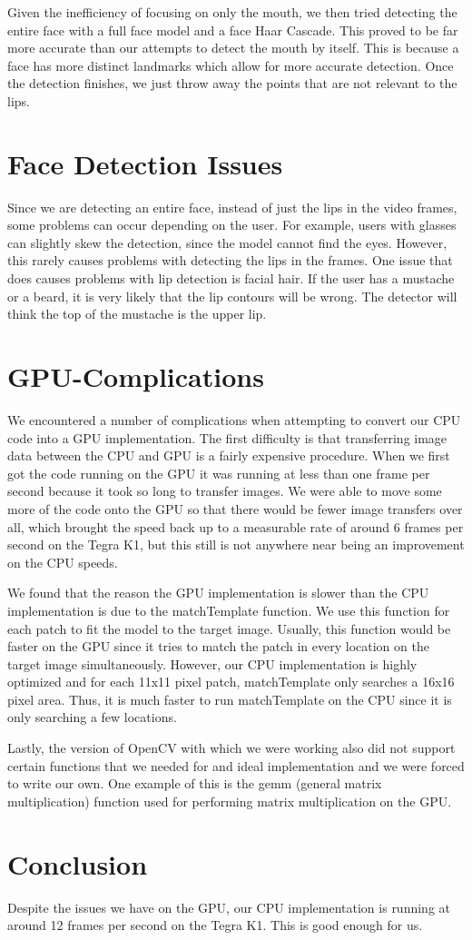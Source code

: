 Given the inefficiency of focusing on only the mouth, we then tried detecting the entire face with a full face model and a face Haar Cascade. This proved to be far more accurate than our attempts to detect the mouth by itself. This is because a face has more distinct landmarks which allow for more accurate detection. Once the detection finishes, we just throw away the points that are not relevant to the lips.

\section{Face Detection Issues}
Since we are detecting an entire face, instead of just the lips in the video frames, some problems can occur depending on the user. For example, users with glasses can slightly skew the detection, since the model cannot find the eyes. However, this rarely causes problems with detecting the lips in the frames. One issue that does causes problems with lip detection is facial hair. If the user has a mustache or a beard, it is very likely that the lip contours will be wrong. The detector will think the top of the mustache is the upper lip.

\section{GPU-Complications}
We encountered a number of complications when attempting to convert our CPU code into a GPU implementation. The first difficulty is that transferring image data between the CPU and GPU is a fairly expensive procedure. When we first got the code running on the GPU it was running at less than one frame per second because it took so long to transfer images. We were able to move some more of the code onto the GPU so that there would be fewer image transfers over all, which brought the speed back up to a measurable rate of around 6 frames per second on the Tegra K1, but this still is not anywhere near being an improvement on the CPU speeds.

We found that the reason the GPU implementation is slower than the CPU implementation is due to the matchTemplate function. We use this function for each patch to fit the model to the target image. Usually, this function would be faster on the GPU since it tries to match the patch in every location on the target image simultaneously. However, our CPU implementation is highly optimized and for each 11x11 pixel patch, matchTemplate only searches a 16x16 pixel area. Thus, it is much faster to run matchTemplate on the CPU since it is only searching a few locations.

Lastly, the version of OpenCV with which we were working also did not support certain functions that we needed for and ideal implementation and we were forced to write our own. One example of this is the gemm (general matrix multiplication) function used for performing matrix multiplication on the GPU.

\section{Conclusion}
Despite the issues we have on the GPU, our CPU implementation is running at around 12 frames per second on the Tegra K1. This is good enough for us.
